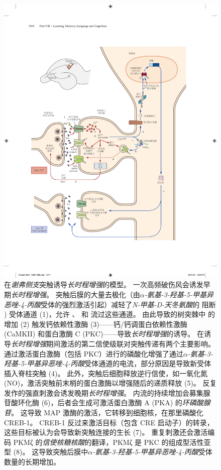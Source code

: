 \begin{figure}[htbp]
	\centering
	\includegraphics[width=0.9\linewidth]{chap54/fig_54_3}
	\caption{在\textit{谢弗侧支}突触诱导\textit{长时程增强}的模型。
		一次高频破伤风会诱发早期\textit{长时程增强}。
		突触后膜的大量去极化（由\textit{$\alpha$-氨基-3-羟基-5-甲基异恶唑-4-丙酸}受体的强烈激活引起）减轻了\textit{N-甲基-D-天冬氨酸}的  阻断 ) 受体通道 (1)，允许 、 和  流过这些通道。
		由此导致的树突棘中  的增加 (2) 触发钙依赖性激酶 (3)——钙/钙调蛋白依赖性激酶 (CaMKII) 和蛋白激酶 C (PKC)——导致\textit{长时程增强}的诱导。
		在诱导\textit{长时程增强}期间激活的第二信使级联对突触传递有两个主要影响。
		通过激活蛋白激酶（包括 PKC）进行的磷酸化增强了通过\textit{$\alpha$-氨基-3-羟基-5-甲基异恶唑-4-丙酸}受体通道的电流，部分原因是导致新受体插入脊柱突触 (4)。
		此外，突触后细胞释放逆行信使，如一氧化氮 (NO)，激活突触前末梢的蛋白激酶以增强随后的递质释放 (5)。
		反复发作的强直刺激会诱发晚期\textit{长时程增强}。
		 内流的持续增加会募集腺苷酸环化酶 (6)，后者会生成可激活蛋白激酶 A (PKA) 的\textit{环磷酸腺苷}。
		这导致 MAP 激酶的激活，它转移到细胞核，在那里磷酸化 CREB-1。
		CREB-1 反过来激活目标（包含 CRE 启动子）的转录，这些目标被认为会导致新突触连接的生长 (7)。
		重复刺激还会激活编码 PKMζ 的\textit{信使核糖核酸}的翻译，PKMζ 是 PKC 的组成型活性亚型 (8)。
		这导致突触后膜中\textit{$\alpha$-氨基-3-羟基-5-甲基异恶唑-4-丙酸}受体数量的长期增加。}
	\label{fig:54_3}
\end{figure}


